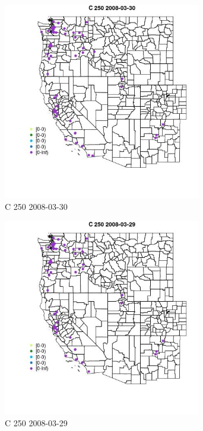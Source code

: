 \begin{figure} 
\centering  
\includegraphics[width=0.77\textwidth]{Code_Outputs/Report_ML_input_PM25_Step4_part_e_de_duplicated_aves_MapObsC_2502008-03-30.jpg} 
\caption{\label{fig:Report_ML_input_PM25_Step4_part_e_de_duplicated_avesMapObsC_2502008-03-30}C 250 2008-03-30} 
\end{figure} 
 

\begin{figure} 
\centering  
\includegraphics[width=0.77\textwidth]{Code_Outputs/Report_ML_input_PM25_Step4_part_e_de_duplicated_aves_MapObsC_2502008-03-29.jpg} 
\caption{\label{fig:Report_ML_input_PM25_Step4_part_e_de_duplicated_avesMapObsC_2502008-03-29}C 250 2008-03-29} 
\end{figure} 
 

